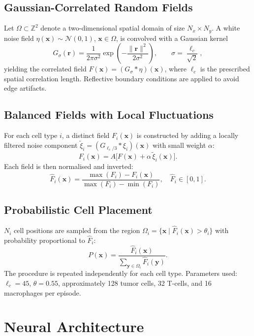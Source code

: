 \documentclass{article}
\begin{document}
\subsection*{Gaussian-Correlated Random Fields}

Let $\Omega \subset \mathbb{Z}^2$ denote a two-dimensional spatial domain of
size $N_x \times N_y$. A white noise field
$\eta(\mathbf{x}) \sim \mathcal{N}(0,1)$, $\mathbf{x} \in \Omega$,
is convolved with a Gaussian kernel
\[
  G_\sigma(\mathbf{r}) = \frac{1}{2\pi\sigma^2}
  \exp\!\left(-\frac{\|\mathbf{r}\|^2}{2\sigma^2}\right),
  \qquad \sigma = \frac{\ell_c}{\sqrt{2}},
\]
yielding the correlated field $F(\mathbf{x}) = (G_\sigma * \eta)(\mathbf{x})$,
where $\ell_c$ is the prescribed spatial correlation length.
Reflective boundary conditions are applied to avoid edge artifacts.

\subsection*{Balanced Fields with Local Fluctuations}

For each cell type $i$, a distinct field $F_i(\mathbf{x})$ is constructed by
adding a locally filtered noise component $\tilde{\xi}_i = (G_{\ell_c/3} *
\xi_i)(\mathbf{x})$ with small weight $\alpha$:
\[
  F_i(\mathbf{x}) = A\bigl[F(\mathbf{x}) + \alpha\,\tilde{\xi}_i(\mathbf{x})\bigr].
\]
Each field is then normalised and inverted:
\[
  \hat{F}_i(\mathbf{x}) =
  \frac{\max(F_i) - F_i(\mathbf{x})}{\max(F_i) - \min(F_i)},
  \quad \hat{F}_i \in [0,1].
\]

\subsection*{Probabilistic Cell Placement}

$N_i$ cell positions are sampled from the region
$\Omega_i = \{\mathbf{x} \mid \hat{F}_i(\mathbf{x}) > \theta_i\}$
with probability proportional to $\hat{F}_i$:
\[
  P(\mathbf{x}) = \frac{\hat{F}_i(\mathbf{x})}
  {\sum_{\mathbf{y}\in\Omega_i}\hat{F}_i(\mathbf{y})}.
\]
The procedure is repeated independently for each cell type.
Parameters used: $\ell_c = 45$, $\theta = 0.55$, approximately 128 tumor
cells, 32 T-cells, and 16 macrophages per episode.

\section{Neural Architecture}
\label{app:arch}
\end{document}
